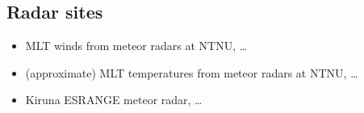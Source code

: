 \subsection{Radar sites}
\begin{itemize}
  \item MLT winds from meteor radars at NTNU, \ldots
  \item (approximate) MLT temperatures from meteor radars at NTNU, \ldots
  \item Kiruna ESRANGE meteor radar, \ldots
\end{itemize}